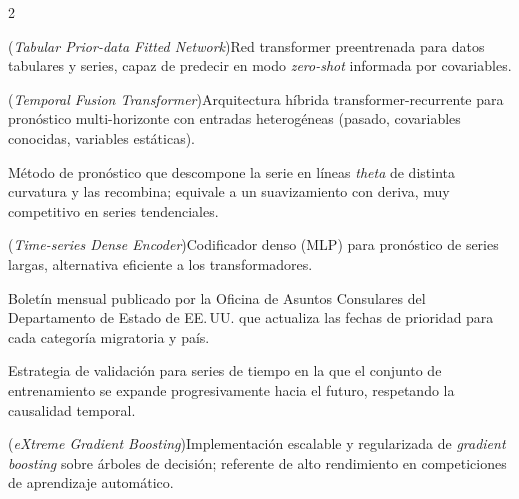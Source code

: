 \documentclass[12pt,letterpaper]{report}
\begin{document}
\begin{multicols}{2}
\begin{description}[leftmargin=0pt, labelindent=0pt, itemindent=0pt,
                    labelsep=0.4em, font=\bfseries\scriptsize,
                    itemsep=2pt, parsep=0pt, topsep=0pt]
    \item[TabPFN] (\textit{Tabular Prior-data Fitted Network})\hspace{0.3em}Red transformer preentrenada para datos tabulares y series, capaz de predecir en modo \textit{zero-shot} informada por covariables.

    \item[TFT] (\textit{Temporal Fusion Transformer})\hspace{0.3em}Arquitectura híbrida transformer-recurrente para pronóstico multi-horizonte con entradas heterogéneas (pasado, covariables conocidas, variables estáticas).

    \item[Theta (método)] Método de pronóstico que descompone la serie en líneas \textit{theta} de distinta curvatura y las recombina; equivale a un suavizamiento con deriva, muy competitivo en series tendenciales.

    \item[TiDE] (\textit{Time-series Dense Encoder})\hspace{0.3em}Codificador denso (MLP) para pronóstico de series largas, alternativa eficiente a los transformadores.

    \item[\textit{Visa Bulletin}] Boletín mensual publicado por la Oficina de Asuntos Consulares del Departamento de Estado de EE.\,UU. que actualiza las fechas de prioridad para cada categoría migratoria y país.

    \item[Walk-forward Validation] Estrategia de validación para series de tiempo en la que el conjunto de entrenamiento se expande progresivamente hacia el futuro, respetando la causalidad temporal.

    \item[XGBoost] (\textit{eXtreme Gradient Boosting})\hspace{0.3em}Implementación escalable y regularizada de \textit{gradient boosting} sobre árboles de decisión; referente de alto rendimiento en competiciones de aprendizaje automático.
\end{description}
\end{multicols}

\end{document}
